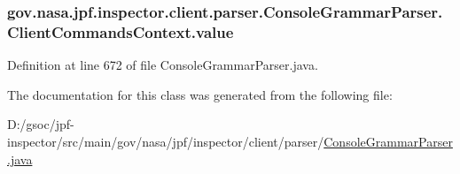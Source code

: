 \subsubsection[{\texorpdfstring{value}{value}}]{ gov.\+nasa.\+jpf.\+inspector.\+client.\+parser.\+Console\+Grammar\+Parser.\+Client\+Commands\+Context.\+value}\hypertarget{classgov_1_1nasa_1_1jpf_1_1inspector_1_1client_1_1parser_1_1_console_grammar_parser_1_1_client_commands_context_a2cc5d4582fb6cb387ace3a214eaba754}{}\label{classgov_1_1nasa_1_1jpf_1_1inspector_1_1client_1_1parser_1_1_console_grammar_parser_1_1_client_commands_context_a2cc5d4582fb6cb387ace3a214eaba754}


Definition at line 672 of file Console\+Grammar\+Parser.\+java.



The documentation for this class was generated from the following file\+:\begin{DoxyCompactItemize}
\item 
D\+:/gsoc/jpf-\/inspector/src/main/gov/nasa/jpf/inspector/client/parser/\hyperlink{_console_grammar_parser_8java}{Console\+Grammar\+Parser.\+java}\end{DoxyCompactItemize}

